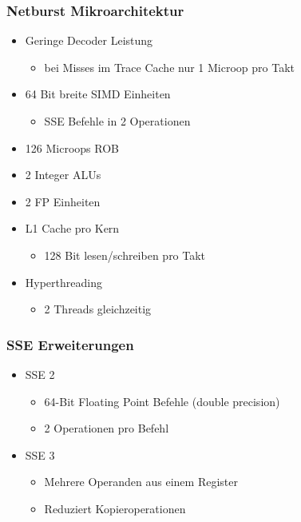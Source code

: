 \subsubsection{Netburst Mikroarchitektur}
\begin{itemize}
	\item Geringe Decoder Leistung
	\begin{itemize}
		\item bei Misses im Trace Cache nur 1 Microop pro Takt
	\end{itemize}
	\item 64 Bit breite SIMD Einheiten
	\begin{itemize}
		\item SSE Befehle in 2 Operationen
	\end{itemize}
	\item 126 Microops ROB
	\item 2 Integer ALUs
	\item 2 FP Einheiten
	\item L1 Cache pro Kern
	\begin{itemize}
		\item 128 Bit lesen/schreiben pro Takt
	\end{itemize}
	\item Hyperthreading
	\begin{itemize}
		\item 2 Threads gleichzeitig
	\end{itemize}
\end{itemize}
\subsubsection{SSE Erweiterungen}
\begin{itemize}
	\item SSE 2
	\begin{itemize}
		\item 64-Bit Floating Point Befehle (double precision)
		\item 2 Operationen pro Befehl
	\end{itemize}
	\item SSE 3
	\begin{itemize}
		\item Mehrere Operanden aus einem Register
		\item Reduziert Kopieroperationen
	\end{itemize}
\end{itemize}
